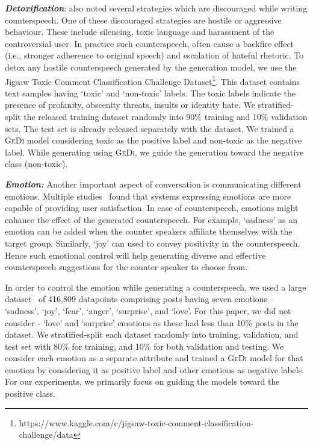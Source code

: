 \newline

\textbf{\textit{Detoxification}}: \citet{benesch2016considerations} also noted several strategies which are discouraged while writing counterspeech. One of these discouraged strategies are hostile or aggressive behaviour. These include silencing, toxic language and harassment of the controversial user. In practice such counterspeech, often cause a backfire effect (i.e., stronger adherence to original speech) and escalation of hateful rhetoric. To detox any hostile counterspeech generated by the generation model, we use the Jigsaw Toxic Comment Classification Challenge Dataset\footnote{https://www.kaggle.com/c/jigsaw-toxic-comment-classification-challenge/data}. This dataset contains text samples having `toxic' and `non-toxic' labels. The toxic labels indicate the presence of profanity, obscenity threats, insults or identity hate. We stratified-split the released training dataset randomly into 90\% training and 10\% validation sets. The test set is already released separately with the dataset. 
We trained a \textsc{GeDi} model considering toxic as the positive label and non-toxic as the negative label. While generating using \textsc{GeDi}, we guide the generation toward the negative class (non-toxic). 

\newline

\textbf{\textit{Emotion:}} Another important aspect of conversation is communicating different emotions. Multiple studies~\cite{prendinger2005empathic,partala2004effects} found that systems expressing emotions are more capable of providing user satisfaction. In case of counterspeech, emotions might enhance the effect of the generated counterspeech. For example, `sadness' as an emotion can be added when the counter speakers affiliate themselves with the target group. Similarly, `joy' can used to convey positivity in the counterspeech. Hence such emotional control will help generating diverse and effective counterspeech suggestions for the counter speaker to choose from.

\newline
In order to control the emotion while generating a counterspeech, we used a large dataset~\cite{saravia2018carer} of 416,809 datapoints comprising posts having seven emotions -- `sadness', `joy', `fear', `anger', `surprise', and `love'. For this paper, we did not consider - `love' and `surprise' emotions as these had less than 10\% posts in the dataset. We stratified-split each dataset randomly into training, validation, and test set with 80\% for training, and 10\% for both validation and testing. We consider each emotion as a separate attribute and trained a \textsc{GeDi} model for that emotion by considering it as positive label and other emotions as negative labels. For our experiments, we primarily focus on guiding the models toward the positive class.

